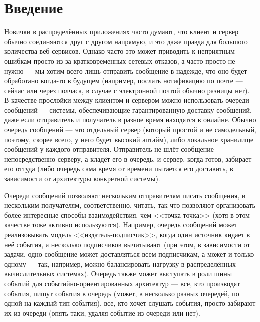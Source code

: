 \documentclass{../../text-style}
\begin{document}
\maketitle
\thispagestyle{empty}

\section{Введение}

Новички в распределённых приложениях часто думают, что клиент и сервер обычно соединяются друг с другом напрямую, и это даже правда для большого количества веб-сервисов. Однако часто это может приводить к неприятным ошибкам просто из-за кратковременных сетевых отказов, а часто просто не нужно --- мы хотим всего лишь отправить сообщение в надежде, что оно будет обработано когда-то в будущем (например, послать нотификацию по почте --- сейчас или через полчаса, в случае с электронной почтой обычно разницы нет). В качестве прослойки между клиентом и сервером можно использовать очереди сообщений --- системы, обеспечивающие гарантированную доставку сообщений, даже если отправитель и получатель в разное время находятся в онлайне. Обычно очередь сообщений --- это отдельный сервер (который простой и не самодельный, поэтому, скорее всего, у него будет высокий аптайм), либо локальное хранилище сообщений у каждого отправителя. Отправитель не шлёт сообщение непосредственно серверу, а кладёт его в очередь, и сервер, когда готов, забирает его оттуда (либо очередь сама время от времени пытается его доставить, в зависимости от архитектуры конкретной системы).

Очереди сообщений позволяют нескольким отправителям писать сообщения, и нескольким получателям, соответственно, читать, так что позволяют организовать более интересные способы взаимодействия, чем <<точка-точка>> (хотя в этом качестве тоже активно используются). Например, очередь сообщений может реализовывать модель <<издатель-подписчик>>, когда один источник кидает в неё события, а несколько подписчиков вычитывают (при этом, в зависимости от задачи, одно сообщение может доставляться всем подписчикам, а может и только одному --- так, например, можно балансировать нагрузку в распределённых вычислительных системах). Очередь также может выступать в роли шины событий для событийно-ориентированных архитектур --- все, кто производят события, пишут события в очередь (может, в несколько разных очередей, по одной на каждый тип события), все, кто хочет слушать события, просто забирают их из очереди (опять-таки, удаляя событие из очереди или нет).
\end{document}
